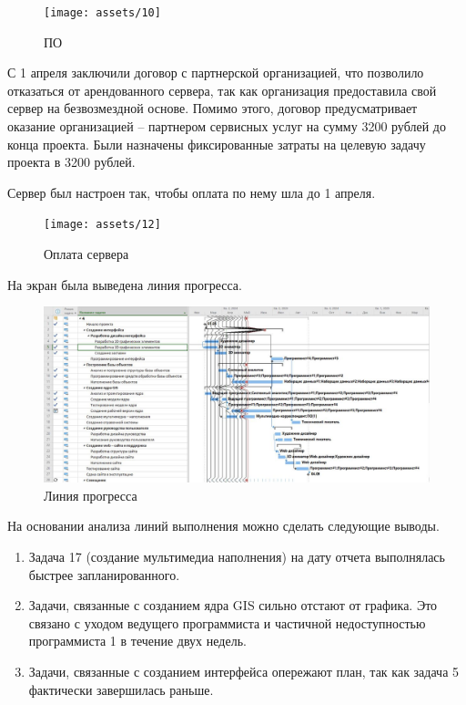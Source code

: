\begin{figure}[H]
    \begin{center}
    \texttt{[image: assets/10]}
    \caption{ПО}
    \label{fig:10}
    \end{center}
\end{figure}

С 1 апреля заключили договор с партнерской организацией, что позволило отказаться от арендованного сервера, так как организация предоставила свой сервер на безвозмездной основе. Помимо этого, договор предусматривает оказание организацией – партнером сервисных услуг на сумму 3200 рублей до конца проекта. Были назначены фиксированные затраты на целевую задачу проекта в 3200 рублей.

Сервер был настроен так, чтобы оплата по нему шла до 1 апреля.

\begin{figure}[H]
    \begin{center}
    \texttt{[image: assets/12]}
    \caption{Оплата сервера}
    \label{fig:12}
    \end{center}
\end{figure}

На экран была выведена линия прогресса.

\begin{figure}[H]
    \begin{center}
    \includegraphics[width=1\linewidth]{assets/13}
    \caption{Линия прогресса}
    \label{fig:13}
    \end{center}
\end{figure}

На основании анализа линий выполнения можно сделать следующие выводы.

\begin{enumerate}
	\item Задача 17 (создание мультимедиа наполнения) на дату отчета выполнялась быстрее запланированного.
	\item Задачи, связанные с созданием ядра GIS сильно отстают от графика. Это связано с уходом ведущего программиста и частичной недоступностью программиста 1 в течение двух недель.
	\item Задачи, связанные с созданием интерфейса опережают план, так как задача 5 фактически завершилась раньше.
\end{enumerate}


